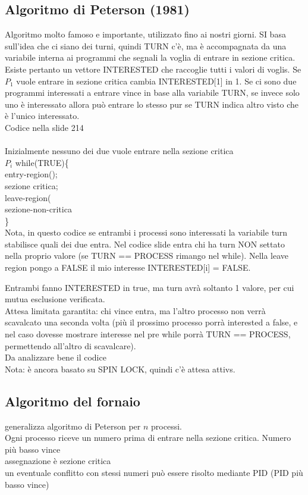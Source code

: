 \documentclass{article}
\begin{document}
\subsection{Algoritmo di Peterson (1981)}
Algoritmo molto famoso e importante, utilizzato fino ai nostri giorni. SI basa sull'idea che ci siano dei turni, quindi TURN c'è, ma è accompagnata da una variabile interna ai programmi che segnali la voglia di entrare in sezione critica. Esiste pertanto un vettore INTERESTED che raccoglie tutti i valori di voglis. Se $P_1$ vuole entrare in sezione critica cambia INTERESTED[1] in 1. Se ci sono due programmi interessati a entrare vince in base alla variabile TURN, se invece solo uno è interessato allora può entrare lo stesso pur se TURN indica altro visto che è l'unico interessato.\\
Codice nella slide 214\\
\\
Inizialmente nessuno dei due vuole entrare nella sezione critica\\

$P_i$
while(TRUE)\{ \\
entry-region();\\
sezione critica;\\
leave-region(\\
sezione-non-critica\\
\}\\

Nota, in questo codice se entrambi i processi sono interessati la variabile turn stabilisce quali dei due entra. Nel codice slide entra chi ha turn NON settato nella proprio valore (se TURN == PROCESS rimango nel while).
Nella leave region pongo a FALSE il mio interesse INTERESTED[i] = FALSE.

Entrambi fanno INTERESTED in true, ma turn avrà soltanto 1 valore, per cui mutua esclusione verificata.\\
Attesa limitata garantita: chi vince entra, ma l'altro processo non verrà scavalcato una seconda volta (più il prossimo processo porrà interested a false, e nel caso dovesse mostrare interesse nel pre while porrà TURN == PROCESS, permettendo all'altro di scavalcare).\\
Da analizzare bene il codice \\
Nota: è ancora basato su SPIN LOCK, quindi c'è attesa attivs.
\subsection{Algoritmo del fornaio}
generalizza algoritmo di Peterson per $n$ processi. \\
Ogni processo riceve un numero prima di entrare nella sezione critica. Numero più basso vince
\\
assegnazione è sezione critica
\\ un eventuale conflitto con stessi numeri può essere risolto mediante PID (PID più basso vince)
\end{document}
